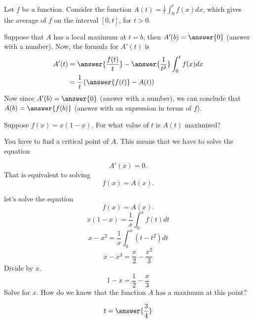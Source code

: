 \documentclass{ximera}
\author{Steven Gubkin\and nela Lakos}
\begin{document}
\begin{exercise}

Let $f$ be a function.  Consider the function $A(t) = \frac{1}{t} \int_0^t f(x) dx $, which gives the average of $f$ on the interval $[0,t]$, for $t>0$.  

Suppose that $A$ has a local maximum at $t=b$, then $A'(b) = \answer{0}$ (answer with a number).  Now, the formula for $A'(t)$ is
\begin{align*}
A'(t) &= \answer{\frac{f(t)}{t}} - \answer{\frac{1}{t^2}}\int_0^tf(x)d x\\
&= \frac{1}{t}\left(\answer{f(t)}-A(t)\right)
\end{align*}
Now since $A'(b) = \answer{0}$ (answer with a number), we can conclude that $A(b) = \answer{f(b)}$ (answer with an expression in terms of $f$).



Suppose $f(x)  = x(1-x)$.  For what value of $t$ is $A(t)$ maximized?
\begin{hint}
You have to find a critical point of $A$.
This means that we have to solve the equation

\[
A'(x)=0.
\]
That is equivalent to solving 
\[
f(x)=A(x).
\]
\end{hint}
\begin{hint}
let's solve the equation
\[
f(x)=A(x).
\]
\[
 x(1-x)=\frac{1}{x} \int_0^x f(t) dt
\]
\[
 x-x^2=\frac{1}{x} \int_0^x (t-t^2) dt
\]
\[
 x-x^2= \frac{x}{2}-\frac{x^2}{3}
\]
Divide by $x$.
\[
 1-x= \frac{1}{2}-\frac{x}{3}
\]
Solve for $x$.
How do we know that the function $A$ has a maximum at this point?
\end{hint}
\[
t = \answer{\frac{3}{4}}
\]

\end{exercise}
\end{document}
